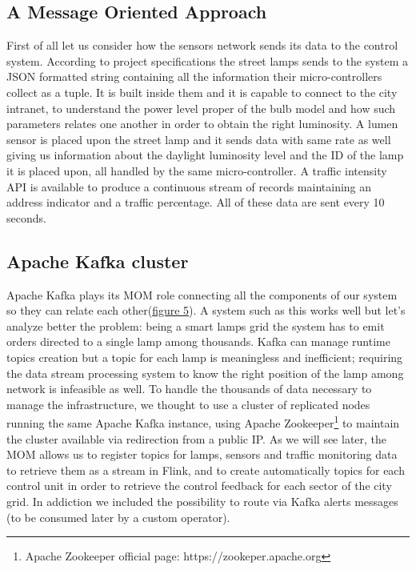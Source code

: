 \subsection{A Message Oriented Approach}
First of all let us consider how the sensors network sends its data to the control system. According to project specifications the street lamps sends to the system a JSON formatted string containing all the information their micro-controllers collect as a tuple. It is built inside them and it is capable to connect to the city intranet, to understand the power level proper of the bulb model and how such parameters relates one another in order to obtain the right luminosity.
 A lumen sensor is placed upon the street lamp and it sends data with same rate as well giving us information about the daylight luminosity level and the ID of the lamp it is placed upon, all handled by the same micro-controller.
 A traffic intensity API is available to produce a continuous stream of records maintaining an address indicator and a traffic percentage. All of these data are sent every 10 seconds.

\subsection{Apache Kafka cluster}
 Apache Kafka plays its MOM role connecting all the components of our system so they can relate each other(\hyperref[fig:ember_kafkatopology]{figure 5}). A system such as this works well but let’s analyze better the problem: being a smart lamps grid the system has to emit orders directed to a single lamp among thousands. Kafka can manage runtime topics creation but a topic for each lamp is meaningless and inefficient; requiring the data stream processing system to know the right position of the lamp among network is infeasible as well.
To handle the thousands of data necessary to manage the infrastructure, we thought to use a cluster of replicated nodes running the same Apache Kafka instance, using Apache Zookeeper\footnote{Apache Zookeeper official page: https://zookeper.apache.org} to maintain the cluster available via redirection from a public IP. As we will see later, the MOM allows us to register topics for lamps, sensors and traffic monitoring data to retrieve them as a stream in Flink, and to create automatically topics for each control unit in order to retrieve the control feedback for each sector of the city grid. In addiction we included the possibility to route via Kafka alerts messages (to be consumed later by a custom operator).

